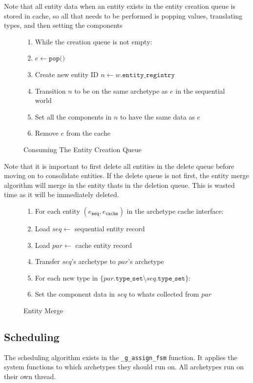 Note that all entity data when an entity exists in the entity creation queue is stored in cache, so all that needs to be performed is popping values, translating types, and then setting the components
\begin{figure}[htbp]
    \begin{enumerate}
        \item While the creation queue is not empty:
        \item $e \leftarrow \texttt{pop()}$
        \item Create new entity ID $n \leftarrow w.\texttt{entity\_registry}$
        \item Transition $n$ to be on the same archetype as $e$ in the sequential world
        \item Set all the components in $n$ to have the same data as $e$
        \item Remove $e$ from the cache
\end{enumerate}
\caption{Consuming The Entity Creation Queue}
\label{alg:entt_cre_queue}
\end{figure}

Note that it is important to first delete all entities in the delete queue before moving on to consolidate entities. If the delete queue is not first, the entity merge algorithm will merge in the entity thats in the deletion queue. This is wasted time as it will be immediately deleted.
\begin{figure}[htbp]
\begin{enumerate}
    \item For each entity $(e_{\texttt{seq}},e_{\texttt{cache}})$ in the archetype cache interface:
    \item Load $seq \leftarrow$ sequential entity record
    \item Load $par \leftarrow$ cache entity record
    \item Transfer $seq$'s archetype to $par$'s archetype
    \item For each new type in $\{par.\texttt{type\_set} \setminus seq.\texttt{type\_set}\}$:
    \item Set the component data in $seq$ to whats collected from $par$ 
\end{enumerate}
\caption{Entity Merge}
\label{alg:entt_merge}
\end{figure}

\subsection{Scheduling}
The scheduling algorithm exists in the \texttt{\_g\_assign\_fsm} function. It applies the system functions to which archetypes they should run on. All archetypes run on their own thread.

